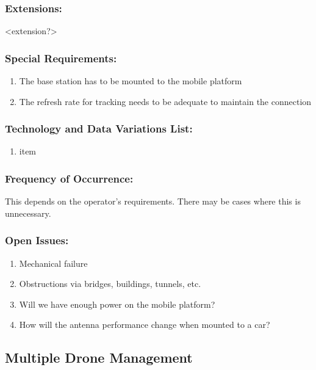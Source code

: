 \documentclass[ProductRequirements.tex]{subfiles}
\begin{document}
	\subsubsection*{Extensions:}
	<extension?>
	\subsubsection*{Special Requirements:}
	\begin{enumerate}\itemsep1pt
		\item The base station has to be mounted to the mobile platform
		\item The refresh rate for tracking needs to be adequate to maintain the connection
	\end{enumerate}
	\subsubsection*{Technology and Data Variations List:}
	\begin{enumerate}\itemsep1pt
		\item item
	\end{enumerate}
	\subsubsection*{Frequency of Occurrence:}
	This depends on the operator's requirements. There may be cases where this is unnecessary.
	\subsubsection*{Open Issues:}
	\begin{enumerate}\itemsep1pt
		\item Mechanical failure
		\item Obstructions via bridges, buildings, tunnels, etc.
		\item Will we have enough power on the mobile platform?
		\item How will the antenna performance change when mounted to a car?
	\end{enumerate}	
	

	
	
	\subsection{Multiple Drone Management}
\end{document}
